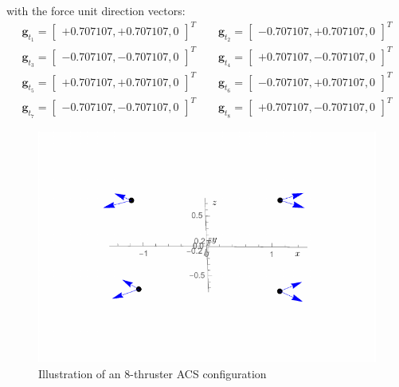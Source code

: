 \documentclass[]{BasiliskReportMemo}
\begin{document}
with the force unit direction vectors:
\begin{gather*}
	\label{eq:th:gt}
	\bm g_{t_{1}} = \begin{bmatrix} +0.707107, +0.707107, 0  \end{bmatrix}^{T}
	\quad\quad
	\bm g_{t_{2}} = \begin{bmatrix} -0.707107, +0.707107, 0  \end{bmatrix}^{T}
	\\
	\bm g_{t_{3}} = \begin{bmatrix} -0.707107, -0.707107, 0  \end{bmatrix}^{T}
	\quad\quad
	\bm g_{t_{4}} = \begin{bmatrix} +0.707107, -0.707107, 0  \end{bmatrix}^{T}
	\\
	\bm g_{t_{5}} = \begin{bmatrix} +0.707107, +0.707107, 0 \end{bmatrix}^{T}
	\quad\quad
	\bm g_{t_{6}} = \begin{bmatrix} -0.707107, +0.707107, 0  \end{bmatrix}^{T}
	\\
	\bm g_{t_{7}} = \begin{bmatrix} -0.707107, -0.707107, 0  \end{bmatrix}^{T}
	\quad\quad
	\bm g_{t_{8}} = \begin{bmatrix} +0.707107, -0.707107, 0  \end{bmatrix}^{T}
\end{gather*}
\begin{figure}[htb]
	\centerline{
	\includegraphics[]{Figures/8ThrConfig}
	}
	\caption{Illustration of an 8-thruster ACS configuration}
	\label{fig:8ThrConfig}
\end{figure}
\end{document}
